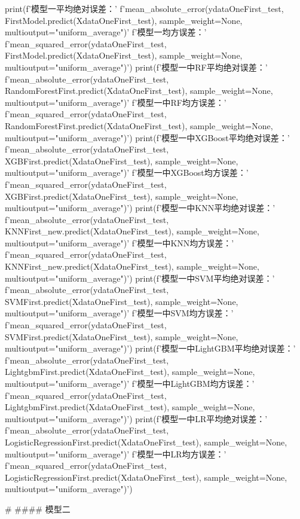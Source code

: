\documentclass{MathorCupmodeling}
\begin{document}
\begin{python}
print(f'模型一平均绝对误差：'
      f'{mean_absolute_error(ydataOneFirst_test, FirstModel.predict(XdataOneFirst_test), sample_weight=None, multioutput="uniform_average")}\n'
      f'模型一均方误差：'
      f'{mean_squared_error(ydataOneFirst_test, FirstModel.predict(XdataOneFirst_test), sample_weight=None, multioutput="uniform_average")}')
print(f'模型一中RF平均绝对误差：'
      f'{mean_absolute_error(ydataOneFirst_test, RandomForestFirst.predict(XdataOneFirst_test), sample_weight=None, multioutput="uniform_average")}\n'
      f'模型一中RF均方误差：'
      f'{mean_squared_error(ydataOneFirst_test, RandomForestFirst.predict(XdataOneFirst_test), sample_weight=None, multioutput="uniform_average")}')
print(f'模型一中XGBoost平均绝对误差：'
      f'{mean_absolute_error(ydataOneFirst_test, XGBFirst.predict(XdataOneFirst_test), sample_weight=None, multioutput="uniform_average")}\n'
      f'模型一中XGBoost均方误差：'
      f'{mean_squared_error(ydataOneFirst_test, XGBFirst.predict(XdataOneFirst_test), sample_weight=None, multioutput="uniform_average")}')
print(f'模型一中KNN平均绝对误差：'
      f'{mean_absolute_error(ydataOneFirst_test, KNNFirst_new.predict(XdataOneFirst_test), sample_weight=None, multioutput="uniform_average")}\n'
      f'模型一中KNN均方误差：'
      f'{mean_squared_error(ydataOneFirst_test, KNNFirst_new.predict(XdataOneFirst_test), sample_weight=None, multioutput="uniform_average")}')
print(f'模型一中SVM平均绝对误差：'
      f'{mean_absolute_error(ydataOneFirst_test, SVMFirst.predict(XdataOneFirst_test), sample_weight=None, multioutput="uniform_average")}\n'
      f'模型一中SVM均方误差：'
      f'{mean_squared_error(ydataOneFirst_test, SVMFirst.predict(XdataOneFirst_test), sample_weight=None, multioutput="uniform_average")}')
print(f'模型一中LightGBM平均绝对误差：'
      f'{mean_absolute_error(ydataOneFirst_test, LightgbmFirst.predict(XdataOneFirst_test), sample_weight=None, multioutput="uniform_average")}\n'
      f'模型一中LightGBM均方误差：'
      f'{mean_squared_error(ydataOneFirst_test, LightgbmFirst.predict(XdataOneFirst_test), sample_weight=None, multioutput="uniform_average")}')
print(f'模型一中LR平均绝对误差：'
      f'{mean_absolute_error(ydataOneFirst_test, LogisticRegressionFirst.predict(XdataOneFirst_test), sample_weight=None, multioutput="uniform_average")}\n'
      f'模型一中LR均方误差：'
      f'{mean_squared_error(ydataOneFirst_test, LogisticRegressionFirst.predict(XdataOneFirst_test), sample_weight=None, multioutput="uniform_average")}')


# #### 模型二


\end{python}
\end{document}
